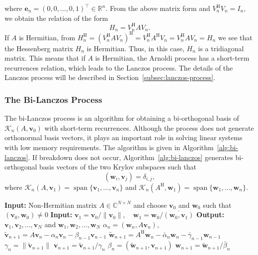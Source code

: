 {where $\bm e_n=(0,0,\ldots,0,1)^\top\in\mathbb R^n$. From the above matrix form and $V_n^{\mathrm H}V_n=I_n$, we obtain the relation of the form}
\begin{equation}\label{eq:arnoldi-projected-matrix}H_n=V_n^{\mathrm H}AV_n.\end{equation}
{If $A$ is Hermitian, from $H_n^{\mathrm H}=(V_n^{\mathrm H}AV_n)^{\mathrm H}=V_n^{\mathrm H}A^{\mathrm H}V_n=V_n^{\mathrm H}AV_n=H_n$ we see that the Hessenberg matrix $H_n$ is Hermitian. Thus, in this case, $H_n$ is a tridiagonal matrix. This means that if $A$ is Hermitian, the Arnoldi process has a short-term recurrences relation, which leads to the Lanczos process. The details of the Lanczos process will be described in Section~\ref{subsec:lanczos-process}.}
\subsubsection{{The Bi-Lanczos Process}}\label{subsec:bi-lanczos-process}
{The bi-Lanczos process is an algorithm for obtaining a bi-orthogonal basis of $\mathcal K_n(A,\bm v_0)$ with short-term recurrences. Although the process does not generate orthonormal basis vectors, it plays an important role in solving linear systems with low memory requirements. The algorithm is given in Algorithm~\ref{alg:bi-lanczos}.}
{If breakdown does not occur, Algorithm~\ref{alg:bi-lanczos} generates bi-orthogonal basis vectors of the two Krylov subspaces such that}
\[(\bm w_i,\bm v_j)=\delta_{i,j},\]
{where $\mathcal K_n(A,\bm v_1)=\operatorname{span}\{\bm v_1,\ldots,\bm v_n\}$ and $\mathcal K_n(A^{\mathrm H},\bm w_1)=\operatorname{span}\{\bm w_1,\ldots,\bm w_n\}$.}
\begin{algorithm}[H]\caption{{The bi-Lanczos process}}\label{alg:bi-lanczos}
\begin{algorithmic}[1]
\Statex\textbf{Input:} {Non-Hermitian matrix $A\in\mathbb C^{N\times N}$ and choose $\bm v_0$ and $\bm w_0$ such that $(\bm v_0,\bm w_0)\ne0$}
\Statex\textbf{Input:} $\bm v_1=\bm v_0/\|\bm v_0\|,\quad\bm w_1=\bm w_0/\overline{(\bm w_0,\bm v_1)}$
\Statex\textbf{Output:} $\bm v_1,\bm v_2,\ldots,\bm v_N$ {and} $\bm w_1,\bm w_2,\ldots,\bm w_N$
\State $\alpha_n=(\bm w_n,A\bm v_n),$
\State $\tilde{\bm v}_{n+1}=A\bm v_n-\alpha_n\bm v_n-\beta_{n-1}\bm v_{n-1}$
\State $\tilde{\bm w}_{n+1}=A^{\mathrm H}\bm w_n-\bar\alpha_n\bm w_n-\bar\gamma_{n-1}\bm w_{n-1}$
\State $\gamma_n=\|\tilde{\bm v}_{n+1}\|$
\State $\bm v_{n+1}=\tilde{\bm v}_{n+1}/\gamma_n$
\State $\beta_n=(\tilde{\bm w}_{n+1},\bm v_{n+1})$
\State $\bm w_{n+1}=\tilde{\bm w}_{n+1}/\bar\beta_n$
\EndFor
\end{algorithmic}\end{algorithm}
